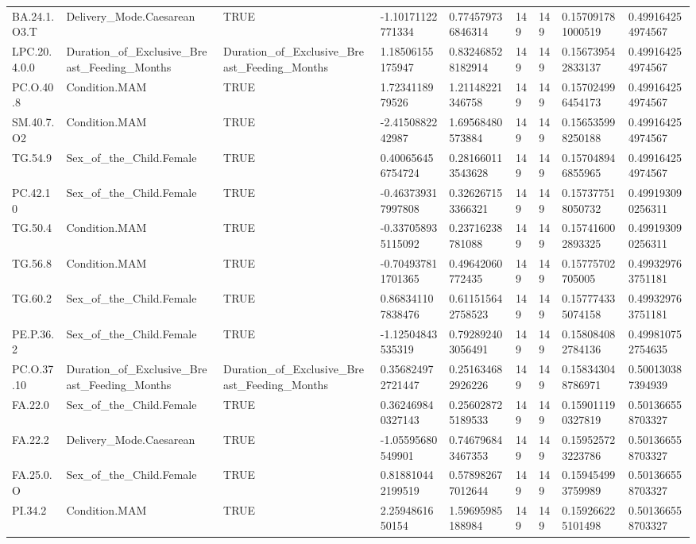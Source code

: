 \begin{longtable}{lllllllll}
BA.24.1.O3.T & Delivery\_Mode.Caesarean & TRUE & -1.10171122771334 & 0.774579736846314 & 149 & 149 & 0.157091781000519 & 0.499164254974567 \\
LPC.20.4.0.0 & Duration\_of\_Exclusive\_Breast\_Feeding\_Months & Duration\_of\_Exclusive\_Breast\_Feeding\_Months & 1.18506155175947 & 0.832468528182914 & 149 & 149 & 0.156739542833137 & 0.499164254974567 \\
PC.O.40.8 & Condition.MAM & TRUE & 1.7234118979526 & 1.21148221346758 & 149 & 149 & 0.157024996454173 & 0.499164254974567 \\
SM.40.7.O2 & Condition.MAM & TRUE & -2.4150882242987 & 1.69568480573884 & 149 & 149 & 0.156535998250188 & 0.499164254974567 \\
TG.54.9 & Sex\_of\_the\_Child.Female & TRUE & 0.400656456754724 & 0.281660113543628 & 149 & 149 & 0.157048946855965 & 0.499164254974567 \\
PC.42.10 & Sex\_of\_the\_Child.Female & TRUE & -0.463739317997808 & 0.326267153366321 & 149 & 149 & 0.157377518050732 & 0.499193090256311 \\
TG.50.4 & Condition.MAM & TRUE & -0.337058935115092 & 0.23716238781088 & 149 & 149 & 0.157416002893325 & 0.499193090256311 \\
TG.56.8 & Condition.MAM & TRUE & -0.704937811701365 & 0.49642060772435 & 149 & 149 & 0.15775702705005 & 0.499329763751181 \\
TG.60.2 & Sex\_of\_the\_Child.Female & TRUE & 0.868341107838476 & 0.611515642758523 & 149 & 149 & 0.157774335074158 & 0.499329763751181 \\
PE.P.36.2 & Sex\_of\_the\_Child.Female & TRUE & -1.12504843535319 & 0.792892403056491 & 149 & 149 & 0.158084082784136 & 0.499810752754635 \\
PC.O.37.10 & Duration\_of\_Exclusive\_Breast\_Feeding\_Months & Duration\_of\_Exclusive\_Breast\_Feeding\_Months & 0.356824972721447 & 0.251634682926226 & 149 & 149 & 0.158343048786971 & 0.500130387394939 \\
FA.22.0 & Sex\_of\_the\_Child.Female & TRUE & 0.362469840327143 & 0.256028725189533 & 149 & 149 & 0.159011190327819 & 0.501366558703327 \\
FA.22.2 & Delivery\_Mode.Caesarean & TRUE & -1.05595680549901 & 0.746796843467353 & 149 & 149 & 0.159525723223786 & 0.501366558703327 \\
FA.25.0.O & Sex\_of\_the\_Child.Female & TRUE & 0.818810442199519 & 0.578982677012644 & 149 & 149 & 0.159454993759989 & 0.501366558703327 \\
PI.34.2 & Condition.MAM & TRUE & 2.2594861650154 & 1.59695985188984 & 149 & 149 & 0.159266225101498 & 0.501366558703327 \\

\end{longtable}

